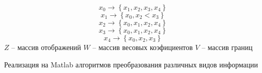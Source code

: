 \documentclass{article}
\begin{document}
	$$
	x_0 \to \left\{x_1, x_2, x_3, x_4\right\}
	$$
	$$
	x_1 \to \left\{ x_0, x_2< x_3\right\}
	$$
	$$
	x_2 \to \left\{x_0, x_1, x_2, x_4\right\}
	$$
	$$
	x_3 \to \left\{x_0, x_1, x_2, x_4\right\}
	$$
	$$
	x_4 \to \left\{x_0, x_2, x_3\right\}
	$$
	$Z$ -- массив отображений
	$W$ -- массив весовых коэфициентов
	$V$ -- массив границ
	
	Реализация на Matlab алгоритмов преобразования различных видов информации

%
%
\end{document}
